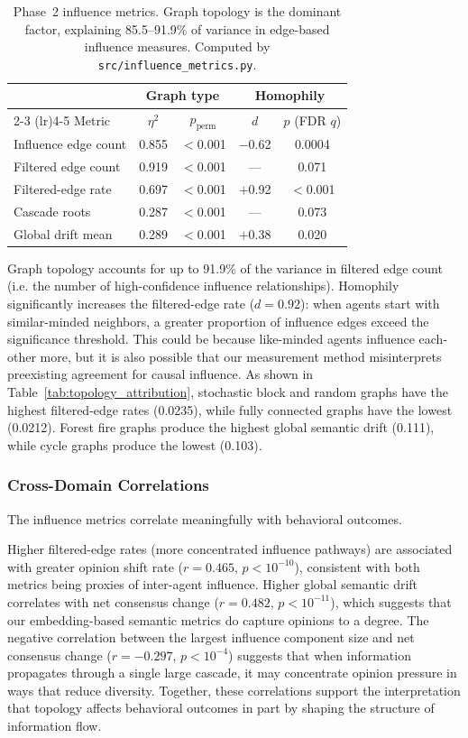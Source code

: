 \documentclass[11pt]{article}
\begin{document}
\begin{table}[t]
\centering
\begin{tabular}{l cc cc}
\toprule
& \multicolumn{2}{c}{Graph type} & \multicolumn{2}{c}{Homophily} \\
\cmidrule(lr){2-3} \cmidrule(lr){4-5}
Metric & $\eta^2$ & $p_{\text{perm}}$ & $d$ & $p$ (FDR $q$) \\
\midrule
Influence edge count & 0.855 & $<$0.001 & $-$0.62 & 0.0004 \\
Filtered edge count  & 0.919 & $<$0.001 & ---     & 0.071 \\
Filtered-edge rate   & 0.697 & $<$0.001 & $+$0.92 & $<$0.001 \\
Cascade roots        & 0.287 & $<$0.001 & ---     & 0.073 \\
Global drift mean    & 0.289 & $<$0.001 & $+$0.38 & 0.020 \\
\bottomrule
\end{tabular}
\caption{Phase~2 influence metrics. Graph topology is the dominant factor, explaining 85.5--91.9\% of variance in edge-based influence measures. Computed by \texttt{src/influence\_metrics.py}.}
\label{tab:phase2_influence}
\end{table}

Graph topology accounts for up to 91.9\% of the variance in filtered edge count (i.e. the number of high-confidence influence relationships). Homophily significantly increases the filtered-edge rate ($d = 0.92$): when agents start with similar-minded neighbors, a greater proportion of influence edges exceed the significance threshold. This could be because like-minded agents influence each-other more, but it is also possible that our measurement method misinterprets preexisting agreement for causal influence. As shown in Table~\ref{tab:topology_attribution}, stochastic block and random graphs have the highest filtered-edge rates (0.0235), while fully connected graphs have the lowest (0.0212). Forest fire graphs produce the highest global semantic drift (0.111), while cycle graphs produce the lowest (0.103).

\subsubsection{Cross-Domain Correlations}

The influence metrics correlate meaningfully with behavioral outcomes.

Higher filtered-edge rates (more concentrated influence pathways) are associated with greater opinion shift rate ($r = 0.465$, $p < 10^{-10}$), consistent with both metrics being proxies of inter-agent influence. Higher global semantic drift correlates with net consensus change ($r = 0.482$, $p < 10^{-11}$), which suggests that our embedding-based semantic metrics do capture opinions to a degree. The negative correlation between the largest influence component size and net consensus change ($r = -0.297$, $p < 10^{-4}$) suggests that when information propagates through a single large cascade, it may concentrate opinion pressure in ways that reduce diversity. Together, these correlations support the interpretation that topology affects behavioral outcomes in part by shaping the structure of information flow.
\end{document}
